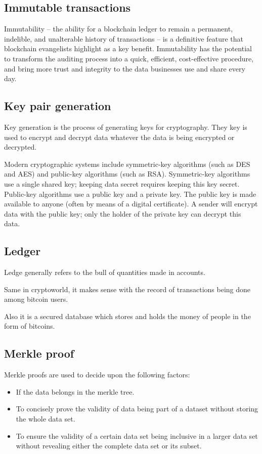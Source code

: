 \documentclass{article}
\begin{document}
\subsection{Immutable transactions}
Immutability -- the ability for a blockchain ledger to remain a permanent,
indelible, and unalterable history of transactions -- is a definitive feature
that blockchain evangelists highlight as a key benefit. Immutability has the
potential to transform the auditing process into a quick, efficient,
cost-effective procedure, and bring more trust and integrity to the data
businesses use and share every day.

\subsection{Key pair generation}
Key generation is the process of generating keys for cryptography. They key is
used to encrypt and decrypt data whatever the data is being encrypted or
decrypted.

Modern cryptographic systems include symmetric-key algorithms (such as DES and
AES) and public-key algorithms (such as RSA). Symmetric-key algorithms use a
single shared key; keeping data secret requires keeping this key secret.
Public-key algorithms use a public key and a private key. The public key is
made available to anyone (often by means of a digital certificate). A sender
will encrypt data with the public key; only the holder of the private key can
decrypt this data.

\subsection{Ledger}
Ledge generally refers to the bull of quantities made in accounts.

Same in cryptoworld, it makes sense with the record of transactions being done
among bitcoin users.

Also it is a secured database which stores and holds the money of people in
the form of bitcoins.

\subsection{Merkle proof}
Merkle proofs are used to decide upon the following factors:
\begin{itemize}
    \item If the data belongs in the merkle tree.
    \item To concisely prove the validity of data being part of a dataset
        without storing the whole data set.
    \item To ensure the validity of a certain data set being inclusive in a
        larger data set without revealing either the complete data set or
        its subset.
\end{itemize}
\end{document}
